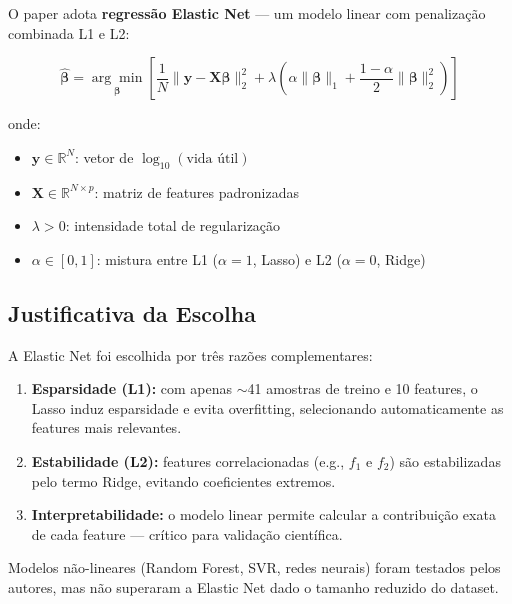 \documentclass[12pt,a4paper]{article}
\begin{document}
O paper adota \textbf{regress\~ao Elastic Net} --- um modelo linear com
penaliza\c{c}\~ao combinada L1 e L2:

\begin{equation}
  \hat{\boldsymbol{\beta}} = \underset{\boldsymbol{\beta}}{\arg\min}
  \left[
    \frac{1}{N}\|\mathbf{y} - \mathbf{X}\boldsymbol{\beta}\|_2^2
    + \lambda\left(\alpha\|\boldsymbol{\beta}\|_1
    + \frac{1-\alpha}{2}\|\boldsymbol{\beta}\|_2^2\right)
  \right]
\end{equation}

onde:
\begin{itemize}
  \item $\mathbf{y} \in \mathbb{R}^N$: vetor de $\log_{10}(\text{vida \'{u}til})$
  \item $\mathbf{X} \in \mathbb{R}^{N \times p}$: matriz de features padronizadas
  \item $\lambda > 0$: intensidade total de regulariza\c{c}\~ao
  \item $\alpha \in [0,1]$: mistura entre L1 ($\alpha=1$, Lasso) e L2 ($\alpha=0$, Ridge)
\end{itemize}

\subsection{Justificativa da Escolha}

A Elastic Net foi escolhida por tr\^{e}s raz\~oes complementares:

\begin{enumerate}
  \item \textbf{Esparsidade (L1):} com apenas $\sim$41 amostras de treino e 10
    features, o Lasso induz esparsidade e evita overfitting, selecionando
    automaticamente as features mais relevantes.

  \item \textbf{Estabilidade (L2):} features correlacionadas (e.g., $f_1$ e $f_2$)
    s\~ao estabilizadas pelo termo Ridge, evitando coeficientes extremos.

  \item \textbf{Interpretabilidade:} o modelo linear permite calcular a contribui\c{c}\~ao
    exata de cada feature --- cr\'{i}tico para valida\c{c}\~ao cient\'{i}fica.
\end{enumerate}

Modelos n\~ao-lineares (Random Forest, SVR, redes neurais) foram testados pelos
autores, mas n\~ao superaram a Elastic Net dado o tamanho reduzido do dataset.
\end{document}
